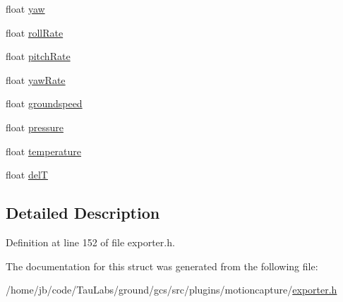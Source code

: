 \begin{DoxyCompactItemize}
float \hyperlink{group___mo_cap_plugin_ga423b4c125aa4c8caf1001d16de1dd3f9}{yaw}
\item 
float \hyperlink{group___mo_cap_plugin_ga178bcd8c81449eb7c9cc5c5bb203e591}{roll\-Rate}
\item 
float \hyperlink{group___mo_cap_plugin_ga03ecf7a98f0b6197c65a71fa1e2a1237}{pitch\-Rate}
\item 
float \hyperlink{group___mo_cap_plugin_gaddfb563223971f02a45ebd14034b2a06}{yaw\-Rate}
\item 
float \hyperlink{group___mo_cap_plugin_gab0735b3db4133ae25e01a4ee6dc3347f}{groundspeed}
\item 
float \hyperlink{group___mo_cap_plugin_ga521e946322d097a3b14b24f53ce1568f}{pressure}
\item 
float \hyperlink{group___mo_cap_plugin_gaa66ae80cf0902b622dea302a9a588fe8}{temperature}
\item 
float \hyperlink{group___mo_cap_plugin_ga0c6d6722adb60229659cfe26d61ec953}{del\-T}
\end{DoxyCompactItemize}


\subsection{\-Detailed \-Description}


\-Definition at line 152 of file exporter.\-h.



\-The documentation for this struct was generated from the following file\-:\begin{DoxyCompactItemize}
\item 
/home/jb/code/\-Tau\-Labs/ground/gcs/src/plugins/motioncapture/\hyperlink{exporter_8h}{exporter.\-h}\end{DoxyCompactItemize}
